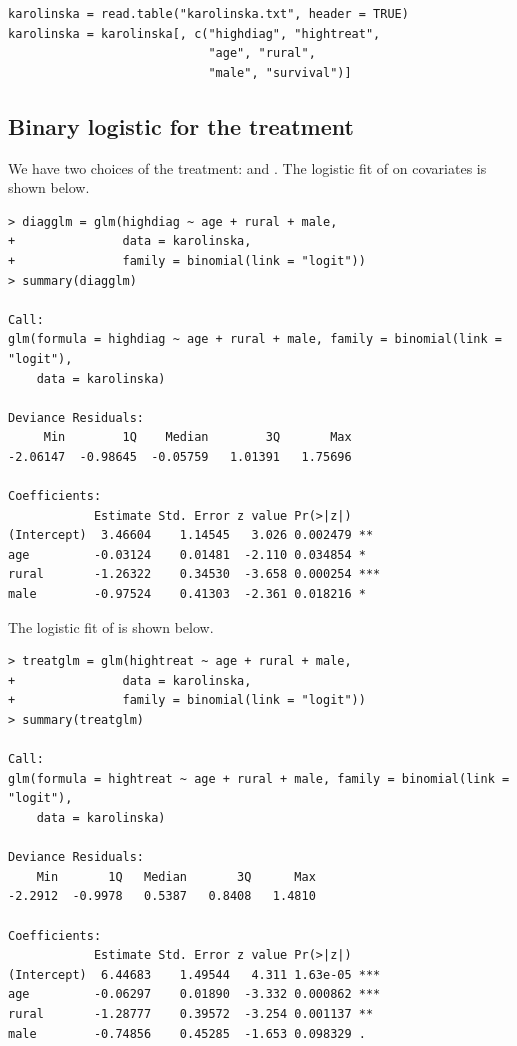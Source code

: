  
\begin{lstlisting}
karolinska = read.table("karolinska.txt", header = TRUE)
karolinska = karolinska[, c("highdiag", "hightreat",
                            "age", "rural", 
                            "male", "survival")]
\end{lstlisting}


\subsection{Binary logistic for the treatment}


We have two choices of the treatment:  and . The logistic fit of  on covariates is shown below.

\begin{lstlisting}
> diagglm = glm(highdiag ~ age + rural + male, 
+               data = karolinska, 
+               family = binomial(link = "logit"))
> summary(diagglm)

Call:
glm(formula = highdiag ~ age + rural + male, family = binomial(link = "logit"), 
    data = karolinska)

Deviance Residuals: 
     Min        1Q    Median        3Q       Max  
-2.06147  -0.98645  -0.05759   1.01391   1.75696  

Coefficients:
            Estimate Std. Error z value Pr(>|z|)    
(Intercept)  3.46604    1.14545   3.026 0.002479 ** 
age         -0.03124    0.01481  -2.110 0.034854 *  
rural       -1.26322    0.34530  -3.658 0.000254 ***
male        -0.97524    0.41303  -2.361 0.018216 *  
\end{lstlisting}

The logistic fit of  is shown below.

\begin{lstlisting}
> treatglm = glm(hightreat ~ age + rural + male, 
+               data = karolinska, 
+               family = binomial(link = "logit"))
> summary(treatglm)

Call:
glm(formula = hightreat ~ age + rural + male, family = binomial(link = "logit"), 
    data = karolinska)

Deviance Residuals: 
    Min       1Q   Median       3Q      Max  
-2.2912  -0.9978   0.5387   0.8408   1.4810  

Coefficients:
            Estimate Std. Error z value Pr(>|z|)    
(Intercept)  6.44683    1.49544   4.311 1.63e-05 ***
age         -0.06297    0.01890  -3.332 0.000862 ***
rural       -1.28777    0.39572  -3.254 0.001137 ** 
male        -0.74856    0.45285  -1.653 0.098329 .  
\end{lstlisting}


